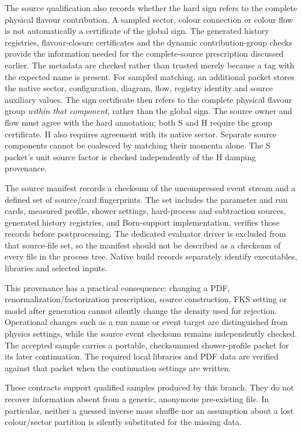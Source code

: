 The source qualification also records whether the hard sign refers to
the complete physical flavour contribution.  A sampled sector, colour
connection or colour flow is not automatically a certificate of the
global sign.  The generated history registries, flavour-closure
certificates and the dynamic contribution-group checks provide the
information needed for the complete-source prescription discussed
earlier.  The metadata are checked rather than trusted merely because a
tag with the expected name is present.
For sampled matching, an additional
 packet stores the native sector,
configuration, diagram, flow, registry identity and source auxiliary
values. The sign certificate then refers to the complete physical
flavour group \emph{within that component}, rather than the global sign.
The source owner and flow must agree with the hard annotation; both
S and H require the group certificate. H also requires agreement with
its native sector. Separate source components cannot be coalesced by
matching their momenta alone. The S packet's unit source factor is
checked independently of the H damping provenance.

The source manifest
 records a checksum of the
uncompressed event stream and a defined set of source/card
fingerprints.  The set includes the parameter and run cards, measured
profile, shower settings, hard-process and subtraction sources,
generated history registries, and Born-support implementation.
 verifies those records before
postprocessing.  The dedicated evaluator driver is excluded from that
source-file set, so the manifest should not be described as a checksum
of every file in the process tree.  Native build records separately
identify executables, libraries and selected inputs.

This provenance has a practical consequence: changing a PDF,
renormalization/factorization prescription, source construction, FKS
setting or model after generation cannot silently change the density
used for rejection.  Operational changes such as a run name or event
target are distinguished from physics settings, while the source
event checksum remains independently checked.  The accepted sample
carries a portable, checksummed shower-profile packet for its later
continuation.  The required local libraries and PDF data are verified
against that packet when the continuation settings are written.

These contracts support qualified samples produced by this branch.
They do not recover information absent from a generic, anonymous
pre-existing \mcatnlo{} file.  In particular, neither a guessed inverse
mass shuffle nor an assumption about a lost colour/sector partition is
silently substituted for the missing data.

